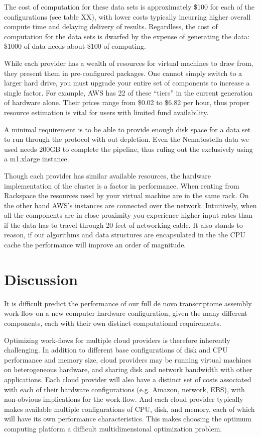 The cost of computation for these data sets is approximately \$100 for
each of the configurations (see table XX), with lower costs typically
incurring higher overall compute time and delaying delivery of
results. Regardless, the cost of computation for the data sets is
dwarfed by the expense of generating the data: \$1000 of data needs
about \$100 of computing.

While each provider has a wealth of resources for virtual machines to
draw  from, they present them in pre-configured packages. One cannot
simply switch to a larger hard drive, you must upgrade your entire set
of components to  increase a single factor. For example, AWS has 22 of
these ``tiers'' in the  current generation of hardware alone. Their
prices range from \$0.02 to \$6.82 per hour, thus proper resource
estimation is vital for users with limited fund availability.

A minimal requirement is to be able to provide enough disk space for a
data set to run through the protocol with out depletion. Even the
Nematostella data  we used needs 200GB to complete the pipeline, thus
ruling out the exclusively using a m1.xlarge instance.

Though each provider has similar available resources, the hardware
implementation of the cluster is a factor in performance. When renting
from Rackspace the resources used by your virtual machine are in the
same rack. On the other hand AWS’s instances are connected over the
network. Intuitively, when all the components are in close proximity
you experience higher input rates than if the data has to travel
through 20 feet of networking cable. It  also stands to reason, if our
algorithms and data structures are encapsulated  in the the CPU cache
the performance will improve an order of magnitude.

\section*{Discussion}

It is difficult predict the performance of our full de novo
transcriptome assembly work-flow on a new computer hardware
configuration, given the many different components, each with their
own distinct computational requirements.

Optimizing work-flows for multiple cloud providers is therefore
inherently challenging.  In addition to different base configurations
of disk and CPU performance and memory size, cloud providers may be
running virtual machines on heterogeneous hardware, and sharing disk
and network bandwidth with other applications.  Each cloud provider
will also have a distinct set of costs associated with each of their
hardware configurations (e.g. Amazon, network, EBS), with non-obvious
implications for the work-flow.  And each cloud provider typically
makes available multiple configurations of CPU, disk, and memory, each
of which will have its own performance characteristics.  This makes
choosing the optimum computing platform a difficult multidimensional
optimization problem.

